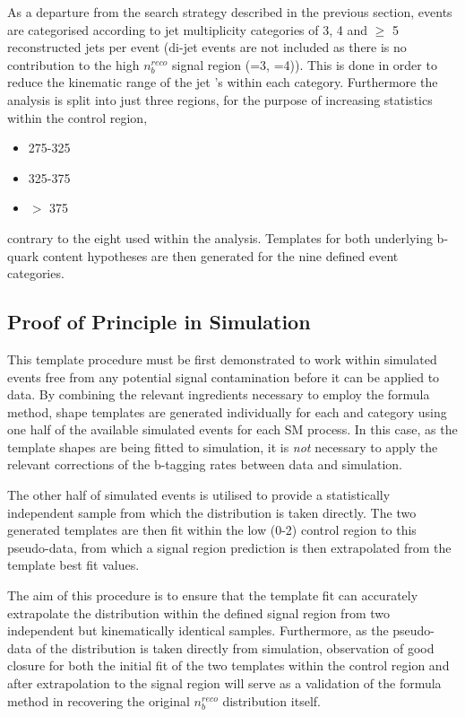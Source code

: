 As a departure from the \alphat search strategy described in the previous section, events are categorised according to jet multiplicity categories of 3, 4 and $\geq$ 5 reconstructed jets per event (di-jet events are not included as there is no contribution to the high $n_{b}^{reco}$ signal region (=3, =4)). This is done in order to reduce the kinematic range of the jet \pt's within each category. Furthermore the analysis is split into just three \theht regions, for the purpose of increasing statistics within the control region, 

\begin{itemize}
\item 275-325 \GeV
\item 325-375 \GeV
\item $>$ 375 \GeV
\end{itemize}

contrary to the eight used within the \alphat analysis. Templates for both underlying b-quark content hypotheses are then generated for the nine defined event categories.

\subsection{Proof of Principle in Simulation}
\label{subsec:templateclosuretest}

This template procedure must be first demonstrated to work within simulated events free from any potential signal contamination before it can be applied to data. By combining the relevant ingredients necessary to employ the formula method, \nbreco shape templates are generated individually for each \njet and \theht category using one half of the available simulated events for each \ac{SM} process. In this case, as the template shapes are being fitted to simulation, it is \emph{not} necessary to apply the relevant corrections of the b-tagging rates between data and simulation. 

The other half of simulated events is utilised to provide a statistically independent sample from which the \nbreco distribution is taken directly. The two generated templates are then fit within the low \nbreco (0-2) control region to this pseudo-data, from which a signal region prediction is then extrapolated from the template best fit values. 

The aim of this procedure is to ensure that the template fit can accurately extrapolate the \nbreco distribution within the defined signal region from two independent but kinematically identical samples. Furthermore, as the pseudo-data of the \nbreco distribution is taken directly from simulation, observation of good closure for both the initial fit of the two templates within the control region and after extrapolation to the signal region will serve as a validation of the formula method in recovering the original $n_{b}^{reco}$ distribution itself. 

